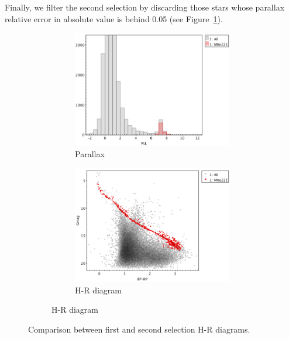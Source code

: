 \documentclass[11pt, a4paper, english]{book}
\begin{document}
Finally, we filter the second selection by discarding those stars whose parallax relative error in absolute value
is behind 0.05 (see Figure~\ref{fig:clusterix_final_selection_melotte_22}).

\begin{figure}[htbp]
  \centering
  \begin{subfigure}{0.9\textwidth}
    \centering
    \begin{subfigure}[t]{0.45\textwidth}
      \centering
      \includegraphics[width=\textwidth]{../figures/clusterix/topcat_3rd_selection_parallax_melotte_22.png}
      \caption{Parallax}
    \end{subfigure}
    \hfill
    \begin{subfigure}[t]{0.45\textwidth}
      \centering
      \includegraphics[width=\textwidth]{../figures/clusterix/topcat_3rd_selection_hr_diagram_melotte_22.png}
      \caption{H-R diagram}
    \end{subfigure}
  \end{subfigure}
  \caption{Comparison between first and second selection H-R diagrams.}
  \label{fig:clusterix_final_selection_melotte_22}
\end{figure}
\end{document}
